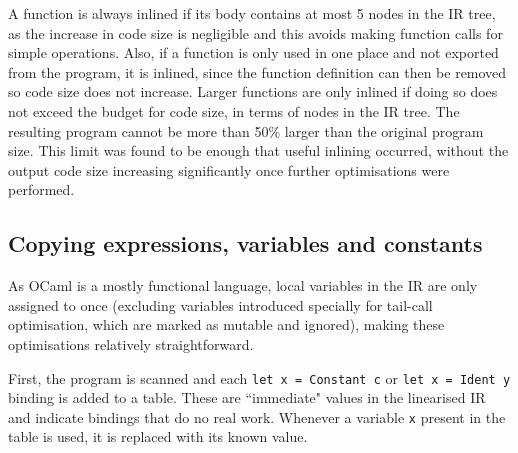 A function is always inlined if its body contains at most 5 nodes in the IR tree, as the increase in code size is negligible and this avoids making function calls for simple operations. Also, if a function is only used in one place and not exported from the program, it is inlined, since the function definition can then be removed so code size does not increase.
Larger functions are only inlined if doing so does not exceed the budget for code size, in terms of nodes in the IR tree. The resulting program cannot be more than 50\% larger than the original program size.
This limit was found to be enough that useful inlining occurred, without the output code size increasing significantly once further optimisations were performed.



\subsection{Copying expressions, variables and constants}
As OCaml is a mostly functional language, local variables in the IR are only assigned to once (excluding variables introduced specially for tail-call optimisation, which are marked as mutable and ignored), making these optimisations relatively straightforward. 

First, the program is scanned and each \verb|let x = Constant c| or \verb|let x = Ident y| binding is added to a table. %
These are ``immediate" values in the linearised IR and indicate bindings that do no real work. Whenever a variable \verb|x| present in the table is used, it is replaced with its known value. 

